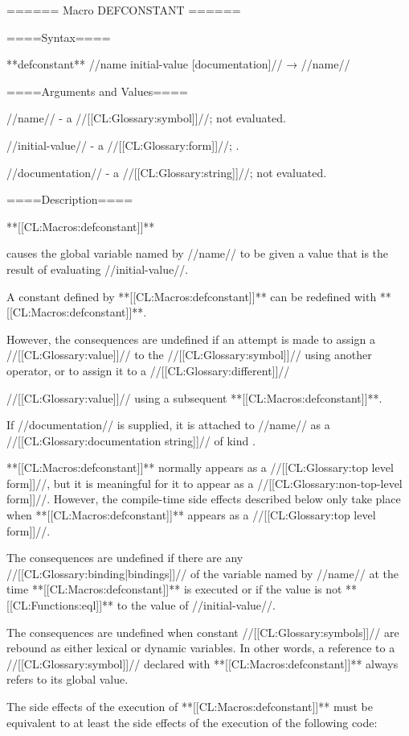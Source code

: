 ====== Macro DEFCONSTANT ======

====Syntax====

**defconstant** //name initial-value [documentation]// → //name//

====Arguments and Values====

//name// - a //[[CL:Glossary:symbol]]//; not evaluated.

//initial-value// - a //[[CL:Glossary:form]]//; \eval.

//documentation// - a //[[CL:Glossary:string]]//; not evaluated.

====Description====

**[[CL:Macros:defconstant]]**

causes the global variable named by //name// to be given a value that is the result of evaluating //initial-value//.

A constant defined by **[[CL:Macros:defconstant]]** can be redefined with **[[CL:Macros:defconstant]]**.

However, the consequences are undefined if an attempt is made to assign a //[[CL:Glossary:value]]// to the //[[CL:Glossary:symbol]]// using another operator, or to assign it to a //[[CL:Glossary:different]]//

//[[CL:Glossary:value]]// using a subsequent **[[CL:Macros:defconstant]]**.

If //documentation// is supplied, it is attached to //name// as a //[[CL:Glossary:documentation string]]// of kind .

**[[CL:Macros:defconstant]]** normally appears as a //[[CL:Glossary:top level form]]//, but it is meaningful for it to appear as a //[[CL:Glossary:non-top-level form]]//. However, the compile-time side effects described below only take place when **[[CL:Macros:defconstant]]** appears as a //[[CL:Glossary:top level form]]//.



The consequences are undefined if there are any //[[CL:Glossary:binding|bindings]]// of the variable named by //name// at the time **[[CL:Macros:defconstant]]** is executed or if the value is not **[[CL:Functions:eql]]** to the value of //initial-value//.

The consequences are undefined when constant //[[CL:Glossary:symbols]]// are rebound as either lexical or dynamic variables. In other words, a reference to a //[[CL:Glossary:symbol]]// declared with **[[CL:Macros:defconstant]]** always refers to its global value.


The side effects of the execution of **[[CL:Macros:defconstant]]** must be equivalent to at least the side effects of the execution of the following code:

